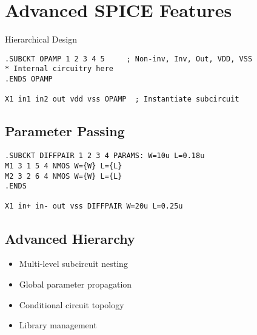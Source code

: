 \documentclass{beamer}
\begin{document}
\section{Advanced SPICE Features}

\begin{frame}{Hierarchical Design}
    \begin{lstlisting}
.SUBCKT OPAMP 1 2 3 4 5     ; Non-inv, Inv, Out, VDD, VSS
* Internal circuitry here
.ENDS OPAMP

X1 in1 in2 out vdd vss OPAMP  ; Instantiate subcircuit
    \end{lstlisting}
    
    \subsection{Parameter Passing}
    \begin{lstlisting}
.SUBCKT DIFFPAIR 1 2 3 4 PARAMS: W=10u L=0.18u
M1 3 1 5 4 NMOS W={W} L={L}
M2 3 2 6 4 NMOS W={W} L={L}
.ENDS

X1 in+ in- out vss DIFFPAIR W=20u L=0.25u
    \end{lstlisting}
    
    \subsection{Advanced Hierarchy}
    \begin{itemize}
        \item Multi-level subcircuit nesting
        \item Global parameter propagation
        \item Conditional circuit topology
        \item Library management
    \end{itemize}
\end{frame}
\end{document}
